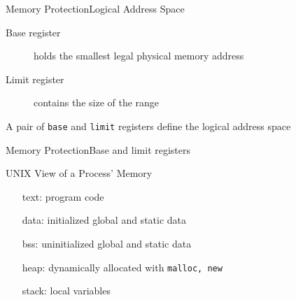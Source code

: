 \begin{frame}{Memory Protection}{Logical Address Space}
  \begin{description}
  \item[Base register] holds the smallest legal physical memory address
  \item[Limit register] contains the size of the range
  \end{description}
  \begin{minipage}{.4\textwidth}
  \end{minipage}\hfill
  \begin{minipage}{.45\textwidth}
    A pair of \texttt{base} and \texttt{limit} registers define the logical address space
    \begin{center}
    \end{center}
    \begin{center}
      {}
    \end{center}
    \begin{center}
    \end{center}
  \end{minipage}
\end{frame}

\begin{frame}{Memory Protection}{Base and limit registers}
  \begin{center}
  \end{center}
\end{frame}

\begin{frame}{UNIX View of a Process' Memory}
  \begin{minipage}{.48\textwidth}
    \begin{center}
    \end{center}
  \end{minipage}\hfill
  \begin{minipage}{.48\textwidth}
    \begin{itemize}
    \item[text:] program code
    \item[data:] initialized global and static data
    \item[bss:] uninitialized global and static data
    \item[heap:] dynamically allocated with \texttt{malloc, new}
    \item[stack:] local variables
    \end{itemize}
  \end{minipage}
\end{frame}


